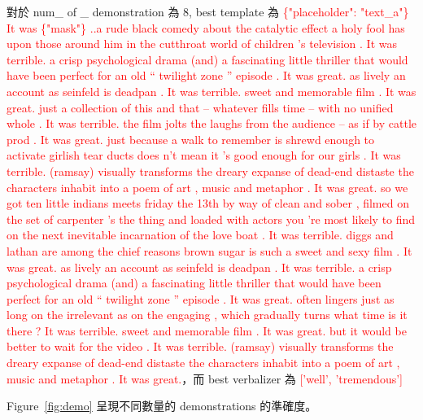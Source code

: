 \documentclass[a4paper,12pt]{article}   %
\newcommand{\xq}[1]{\textcolor{red}{#1}}
\begin{document}
對於 num\_ of \_ demonstration 為 8, best template 為
\xq{\{"placeholder": "text\_a"\} It was \{"mask"\} ..a rude black comedy about the catalytic effect a holy fool has upon those around him in the cutthroat world of children 's television . It was terrible. a crisp psychological drama (and) a fascinating little thriller that would have been perfect for an old `` twilight zone '' episode . It was great. as lively an account as seinfeld is deadpan . It was terrible. sweet and memorable film . It was great. just a collection of this and that -- whatever fills time -- with no unified whole . It was terrible. the film jolts the laughs from the audience -- as if by cattle prod . It was great. just because a walk to remember is shrewd enough to activate girlish tear ducts does n't mean it 's good enough for our girls . It was terrible. (ramsay) visually transforms the dreary expanse of dead-end distaste the characters inhabit into a poem of art , music and metaphor . It was great. so we got ten little indians meets friday the 13th by way of clean and sober , filmed on the set of carpenter 's the thing and loaded with actors you 're most likely to find on the next inevitable incarnation of the love boat . It was terrible. diggs and lathan are among the chief reasons brown sugar is such a sweet and sexy film . It was great. as lively an account as seinfeld is deadpan . It was terrible. a crisp psychological drama (and) a fascinating little thriller that would have been perfect for an old `` twilight zone '' episode . It was great. often lingers just as long on the irrelevant as on the engaging , which gradually turns what time is it there ? It was terrible. sweet and memorable film . It was great. but it would be better to wait for the video . It was terrible. (ramsay) visually transforms the dreary expanse of dead-end distaste the characters inhabit into a poem of art , music and metaphor . It was great.}，而 best verbalizer 為 \xq{['well', 'tremendous']}

\noindent Figure\ \ref{fig:demo} 呈現不同數量的 demonstrations 的準確度。
\end{document}

